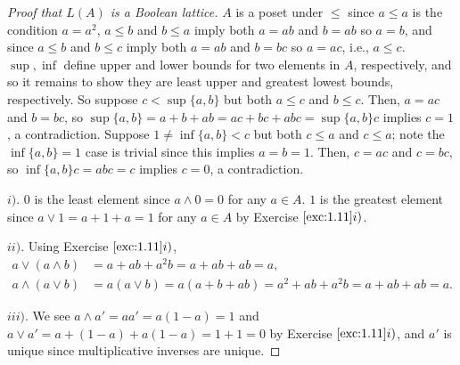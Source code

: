 \documentclass[12pt,letterpaper]{article}
\theoremstyle{definition}
\theoremstyle{remark}
\numberwithin{figure}{problem}
\numberwithin{equation}{section}
\begin{document}
\begin{proof}[Proof that
  $L(A)$ is a Boolean lattice]
  $A$ is a poset under
  $\le$ since
  $a \le
  a$ is the condition
  $a =
  a^2$,
  $a \le
  b$ and
  $b \le
  a$ imply both
  $a =
  ab$ and
  $b =
  ab$ so
  $a =
  b$, and since
  $a \le
  b$ and
  $b \le
  c$ imply both
  $a =
  ab$ and
  $b =
  bc$ so
  $a =
  ac$, i.e.,
  $a \le
  c$.
  $\sup,\inf$ define upper and lower bounds for two elements in
  $A$, respectively, and so it remains to show they are least upper and greatest lowest bounds, respectively.
  So suppose
  $c <
  \sup\{a,b\}$ but both
  $a \le
  c$ and
  $b \le
  c$.
  Then,
  $a =
  ac$ and
  $b =
  bc$, so
  $\sup\{a,b\} = a + b + ab = ac + bc + abc =
  \sup\{a,b\}c$ implies
  $c =
  1$, a contradiction.
  Suppose
  $1 \ne \inf\{a,b\} <
  c$ but both
  $c \le
  a$ and
  $c \le
  a$; note the
  $\inf\{a,b\} =
  1$ case is trivial since this implies
  $a=b=1$.
  Then,
  $c =
  ac$ and
  $c =
  bc$, so
  $\inf\{a,b\}c = abc =
  c$ implies
  $c =
  0$, a contradiction.
  \par
  $i)$.
  $0$ is the least element since
  $a \land 0 =
  0$ for any
  $a \in
  A$.
  $1$ is the greatest element since
  $a \lor 1 = a + 1 + a =
  1$ for any
  $a \in
  A$ by Exercise
  $\ref{exc:1.11}i)$.
  \par
  $ii)$.
  Using Exercise
  $\ref{exc:1.11}i)$,
  \begin{align*}
    a \lor (a \land b) &%
    = a + ab + a^2b = a + ab + ab = a,\\
    a \land (a \lor b) &%
    = a(a \lor b) = a(a + b + ab) = a^2 + ab + a^2b = a + ab + ab = a.
  \end{align*}
  \par
  $iii)$.
  We see
  $a \land a' = aa' = a(1-a) =
  1$ and
  $a \lor a' = a + (1-a) + a(1-a) = 1 + 1 =
  0$ by Exercise
  $\ref{exc:1.11}i)$, and
  $a'$ is unique since multiplicative inverses are unique.
\end{proof}
\end{document}
